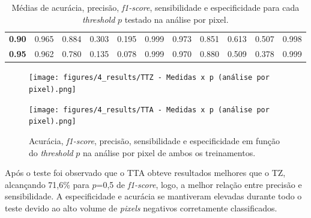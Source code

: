 \begin{table}
\begin{small}
\begin{tabular}{l|l|l|l|l|l|l|l|l|l|l}
    \cellcolor[HTML]{EFEFEF}\textbf{0.90}   & \cellcolor[HTML]{FFEEEE}0.965                 & \cellcolor[HTML]{FFEEEE}0.884               & \cellcolor[HTML]{FFEEEE}0.303                     & \cellcolor[HTML]{FFEEEE}0.195                    & \cellcolor[HTML]{FFEEEE}0.999                 & \cellcolor[HTML]{EEFFEE}0.973                 & \cellcolor[HTML]{EEFFEE}0.851               & \cellcolor[HTML]{EEFFEE}0.613                    & \cellcolor[HTML]{EEFFEE}0.507                    & \cellcolor[HTML]{EEFFEE}0.998                       \\ \cline{1-11}
    \cellcolor[HTML]{EFEFEF}\textbf{0.95}   & \cellcolor[HTML]{FFEEEE}0.962                 & \cellcolor[HTML]{FFEEEE}0.780               & \cellcolor[HTML]{FFEEEE}0.135                     & \cellcolor[HTML]{FFEEEE}0.078                    & \cellcolor[HTML]{FFEEEE}0.999                 & \cellcolor[HTML]{EEFFEE}0.970                 & \cellcolor[HTML]{EEFFEE}0.880               & \cellcolor[HTML]{EEFFEE}0.509                    & \cellcolor[HTML]{EEFFEE}0.378                    & \cellcolor[HTML]{EEFFEE}0.999                       \\ \cline{1-11}
    \end{tabular}
    \end{small}
    \caption{Médias de acurácia, precisão, \textit{f1-score}, sensibilidade e especificidade para cada \textit{threshold} $p$ testado na análise por pixel.}
        \label{tab:metricas-variando-p}
\end{table}

\begin{figure}
    \center
    \texttt{[image: figures/4\_results/TTZ - Medidas x p (análise por pixel).png]}
  
    \texttt{[image: figures/4\_results/TTA - Medidas x p (análise por pixel).png]}
  
    \caption[Métricas obtidas na análise por pixel de ambos os treinamentos.]{Acurácia, \textit{f1-score}, precisão, sensibilidade e especificidade em função do \textit{threshold} $p$ na análise por pixel de ambos os treinamentos.}
    \label{fig:graphic-results}
\end{figure}

Após o teste foi observado que o \acs{TTA} obteve resultados melhores que o \acs{TZ}, alcançando 71,6\% para $p$=0,5 de \textit{f1-score}, logo, a melhor relação entre precisão e sensibilidade. A especificidade e acurácia se mantiveram elevadas durante todo o teste devido ao alto volume de \textit{pixels} negativos corretamente classificados.

